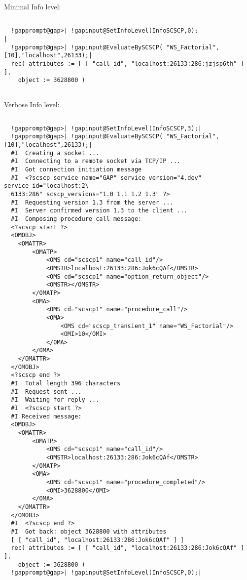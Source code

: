 \documentclass[a4paper,11pt]{report}
\begin{document}
{{{\begin{Verbatim}[commandchars=!@|,fontsize=\small,frame=single,label=Example]
\end{Verbatim}
 

 Minimal Info level: 
\begin{Verbatim}[commandchars=!@|,fontsize=\small,frame=single,label=Example]
  
  !gapprompt@gap>| !gapinput@SetInfoLevel(InfoSCSCP,0);                              |
  !gapprompt@gap>| !gapinput@EvaluateBySCSCP( "WS_Factorial",[10],"localhost",26133);|
  rec( attributes := [ [ "call_id", "localhost:26133:286:jzjsp6th" ] ], 
    object := 3628800 )
  
\end{Verbatim}
 

 Verbose Info level: 
\begin{Verbatim}[commandchars=!@|,fontsize=\small,frame=single,label=Example]
  
  !gapprompt@gap>| !gapinput@SetInfoLevel(InfoSCSCP,3);|
  !gapprompt@gap>| !gapinput@EvaluateBySCSCP( "WS_Factorial",[10],"localhost",26133);|
  #I  Creating a socket ...
  #I  Connecting to a remote socket via TCP/IP ...
  #I  Got connection initiation message
  #I  <?scscp service_name="GAP" service_version="4.dev" service_id="localhost:2\
  6133:286" scscp_versions="1.0 1.1 1.2 1.3" ?>
  #I  Requesting version 1.3 from the server ...
  #I  Server confirmed version 1.3 to the client ...
  #I  Composing procedure_call message: 
  <?scscp start ?>
  <OMOBJ>
  	<OMATTR>
  		<OMATP>
  			<OMS cd="scscp1" name="call_id"/>
  			<OMSTR>localhost:26133:286:Jok6cQAf</OMSTR>
  			<OMS cd="scscp1" name="option_return_object"/>
  			<OMSTR></OMSTR>
  		</OMATP>
  		<OMA>
  			<OMS cd="scscp1" name="procedure_call"/>
  			<OMA>
  				<OMS cd="scscp_transient_1" name="WS_Factorial"/>
  				<OMI>10</OMI>
  			</OMA>
  		</OMA>
  	</OMATTR>
  </OMOBJ>
  <?scscp end ?>
  #I  Total length 396 characters 
  #I  Request sent ...
  #I  Waiting for reply ...
  #I  <?scscp start ?>
  #I Received message: 
  <OMOBJ>
  	<OMATTR>
  		<OMATP>
  			<OMS cd="scscp1" name="call_id"/>
  			<OMSTR>localhost:26133:286:Jok6cQAf</OMSTR>
  		</OMATP>
  		<OMA>
  			<OMS cd="scscp1" name="procedure_completed"/>
  			<OMI>3628800</OMI>
  		</OMA>
  	</OMATTR>
  </OMOBJ>
  #I  <?scscp end ?>
  #I  Got back: object 3628800 with attributes 
  [ [ "call_id", "localhost:26133:286:Jok6cQAf" ] ]
  rec( attributes := [ [ "call_id", "localhost:26133:286:Jok6cQAf" ] ], 
    object := 3628800 )
  !gapprompt@gap>| !gapinput@SetInfoLevel(InfoSCSCP,0);|
  
\end{Verbatim}
 }

}}
\end{document}
